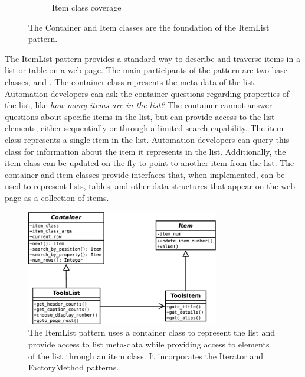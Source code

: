 \begin{figure}[ht!]
\begin{subfigure}[b]{0.45\textwidth}
                \caption{Item class coverage}
                \label{fig:itemlist_container_item_imgs_item}
        \end{subfigure}
        \caption{The Container and Item classes are the foundation of the ItemList pattern.}
        \label{fig:itemlist_container_item_imgs}
\end{figure}


The ItemList pattern provides a standard way to describe and traverse items in
a list or table on a web page. The main participants of the pattern are two
base classes,  and . The container class
represents the meta-data of the list.  Automation developers can ask the
container questions regarding properties of the list, like \textit{how many
items are in the list?} The container cannot answer questions about specific
items in the list, but can provide access to the list elements, either
sequentially or through a limited search capability. The item class represents
a single item in the list.  Automation developers can query this class for
information about the item it represents in the list. Additionally, the item
class can be updated on the fly to point to another item from the list. The
container and item classes provide interfaces that, when implemented, can be
used to represent lists, tables, and other data structures that appear on the web
page as a collection of items.

\begin{figure}[tbh]
  \centering
  \includegraphics[width=0.75\textwidth]
    {../../diagrams/itemlist_pattern.png}
  \caption{ The ItemList pattern uses a container class to represent the
            list and provide access to list meta-data while providing
            access to elements of the list through an item class. It
            incorporates the Iterator and FactoryMethod patterns. }
  \label{fig:itemlist_pattern_class_diagram}
\end{figure}

